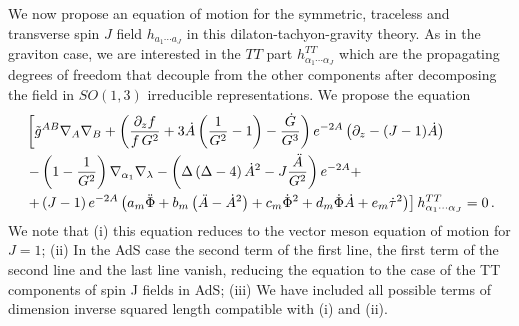 \documentclass[a4paper,12pt]{article}
\begin{document}
We now propose an equation of motion for the symmetric, traceless and transverse spin $J$ field $h_{a_1 \cdots a_J}$ in this dilaton-tachyon-gravity theory. As in the graviton case, we are interested in the $TT$ part $h^{TT}_{\alpha_1 \cdots \alpha_J}$ which are the propagating degrees of freedom that decouple from the other components after decomposing the field in $SO(1,3)$ irreducible representations.
We propose the equation
\begin{align}
& \left[ \tilde{g}^{AB} \nabla_A \nabla_B  + \left( \frac{\partial_z f}{f \, G^2} +  3 \dot{A} \left(  \frac{1}{G^2} - 1\right) - \frac{\dot{G}}{G^3} \right) e^{-2 A} \left( \partial_z - (J-1) \dot{A} \right)  \right. \label{eq:spin_j_meson_eom} \\
&\left. - \left( 1 - \frac{1}{G^2} \right)  \nabla_{\alpha_1} \nabla_\lambda -  \left(  \Delta \left( \Delta - 4 \right) \dot{A}^2 - J \frac{\ddot{A}}{G^2}  \right) e^{-2 A} + \right. \notag \\
& \left. + \left(J-1\right) e^{-2A} \left( a_m \ddot{\Phi} + b_m \left(\ddot{A} - {\dot{A}}^2\right) + c_m {\dot{\Phi}}^2 + d_m \dot{\Phi} \dot{A}  + e_m {\dot{\tau}}^2\right) \right] h^{TT}_{\alpha_1 \cdots \alpha_J} = 0 \,. \notag 
\end{align}
We note that (i) this equation reduces to the vector meson equation of motion for $J = 1$; (ii) In the AdS case the second term of the first line, the first term of the second line and the last line vanish, reducing the equation to the case of the TT components of spin J fields in AdS; (iii) We have included all possible terms of dimension inverse squared length compatible with (i) and (ii).
\end{document}
